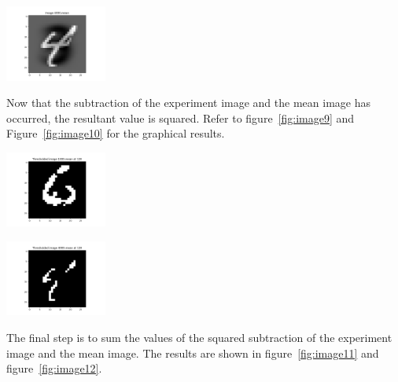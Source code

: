 \begin{center}
\includegraphics[width=0.25\textwidth]{image8.png}
\end{center}
Now that the subtraction of the experiment image and the mean image has occurred, the resultant value is squared. Refer to figure~\ref{fig:image9} and Figure~\ref{fig:image10} for the graphical results.
\begin{center}
\includegraphics[width=0.25\textwidth]{image9.png}
\end{center}

\begin{center}
\includegraphics[width=0.25\textwidth]{image10.png}
\end{center}

The final step is to sum the values of the squared subtraction of the experiment image and the mean image. The results are shown in figure~\ref{fig:image11} and figure~\ref{fig:image12}.
